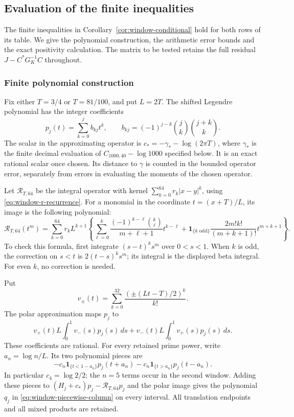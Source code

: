 \subsection{Evaluation of the finite inequalities}
\label{sec:window-finite-evaluation}

The finite inequalities in Corollary~\ref{cor:window-conditional}
hold for both rows of its table.  We give the polynomial construction,
the arithmetic error bounds and the exact positivity calculation.  The
matrix to be tested retains the full residual
$J-C^*G_K^{-1}C$ throughout.

\subsubsection{Finite polynomial construction}

Fix either $T=3/4$ or $T=81/100$, and put $L=2T$.  The
shifted Legendre polynomial has the integer coefficients
\begin{equation}
 p_j(t)=\sum_{k=0}^j b_{kj}t^k,\qquad
 b_{kj}=(-1)^{j-k}\binom jk\binom{j+k}k.
 \label{eq:window-computation-legendre}
\end{equation}
The scalar in the approximating operator is
$c_*=-\gamma_* -\log(2\pi T)$, where $\gamma_*$ is the finite
decimal evaluation of $C_{1000,40}-\log1000$ specified below.
It is an exact rational scalar once chosen.  Its distance to
$\gamma$ is counted in the bounded operator error, separately
from errors in evaluating the moments of the chosen operator.

Let $\mathcal R_{T,64}$ be the integral operator with kernel
$\sum_{k=0}^{64}r_k|x-y|^k$, using
\eqref{eq:window-r-recurrence}.  For a monomial in the coordinate
$t=(x+T)/L$, its image is the following polynomial:
\begin{equation}
 \mathcal R_{T,64}(t^m)=
 \sum_{k=0}^{64}r_kL^{k+1}
 \left\{
 \sum_{\ell=0}^k
  \frac{(-1)^{k-\ell}\binom k\ell}{m+\ell+1}
       t^{k-\ell}
 +\mathbf1_{\{k\text{ odd}\}}
       \frac{2m!k!}{(m+k+1)!}t^{m+k+1}
 \right\}.
 \label{eq:window-computation-kernel}
\end{equation}
To check this formula, first integrate $(s-t)^ks^m$ over
$0<s<1$.  When $k$ is odd, the correction on $s<t$ is
$2(t-s)^ks^m$; its integral is the displayed beta integral.
For even $k$, no correction is needed.

Put
\[
 v_\pm(t)=\sum_{k=0}^{32}\frac{(\pm(Lt-T)/2)^k}{k!}.
\]
The polar approximation maps $p_j$ to
\[
 v_+(t)L\int_0^1v_-(s)p_j(s)\,ds
 +v_-(t)L\int_0^1v_+(s)p_j(s)\,ds.
\]
These coefficients are rational.  For every retained prime power,
write $a_n=\log n/L$.  Its two polynomial pieces are
\[
 -c_n\mathbf1_{\{t<1-a_n\}}p_j(t+a_n)
 -c_n\mathbf1_{\{t>a_n\}}p_j(t-a_n).
\]
In particular $c_4=\log2/2$; the $n=5$ terms occur in the
second window.  Adding these pieces to
$(H_j+c_*)p_j-\mathcal R_{T,64}p_j$ and the polar image
gives the polynomial $q_j$ in
\eqref{eq:window-piecewise-column} on every interval.
All translation endpoints and all mixed products are retained.

